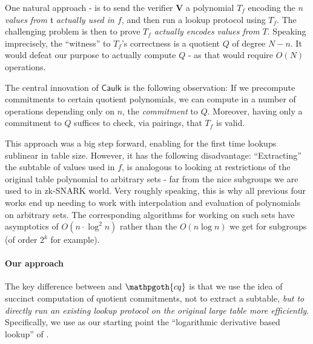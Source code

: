 \documentclass[11pt]{article} %
\newcommand{\cq}{\ensuremath{\mathpgoth{cq} }\xspace}
\newcommand{\caulk}{\ensuremath{\mathsf{Caulk}}\xspace}
\newcommand{\ver}{\ensuremath{\mathsf{\mathbf{V}}}\xspace}
\newcommand{\witsize}{\ensuremath{n}\xspace}
\newcommand{\witruntime}{\ensuremath{\witsize\log\witsize}\xspace}
\newcommand{\tabsize}{\ensuremath{N}\xspace}
\newcommand{\tab}{\ensuremath{\mathfrak{t}}\xspace}
\begin{document}
One natural approach - is to send  the verifier \ver a polynomial $T_f$ encoding 
the \emph{\witsize values from \tab actually used in $f$}, and then run a lookup protocol using $T_f$.
The challenging problem is then to prove \emph{$T_f$ actually encodes values from $T$}.
Speaking imprecisely, the ``witness'' to $T_f$'s correctness is a quotient $Q$ of degree $\tabsize-\witsize$.
It would defeat our purpose to actually compute $Q$ - as that would require $O(\tabsize)$ operations.

The central innovation of \caulk\cite{caulk} is the following observation: If we precompute commitments to certain quotient polynomials, we can compute in a number of operations depending only on \witsize, the \emph{commitment} to $Q$.
Moreover, having only a commitment to $Q$ suffices to check, via pairings, that $T_f$ is valid.




This approach was a big step forward, enabling for the first time lookups sublinear in table size.
However, it has the following disadvantage:
``Extracting'' the subtable of values used in $f$, is analogous to looking at restrictions of the original table polynomial to arbitrary sets - far
from the nice subgroups we are used to in zk-SNARK world. Very roughly speaking, this is why all previous four works end up needing to 
work with interpolation and evaluation of polynomials on arbitrary sets. The corresponding algorithms for working on such sets have asymptotics of $O(\witsize\cdot \log^2 \witsize)$ rather than the $O(\witruntime)$ we get for subgroups (of order $2^k$ for example).

\paragraph{Our approach}
The key difference between \cite{caulk,caulkp,flookup,baloo} and \cq is that we use the idea of succinct computation
of quotient commitments, not to extract a subtable, \emph{but to directly run an existing lookup protocol on the original large table more efficiently}.
Specifically, we use as our starting point the ``logarithmic derivative based lookup'' of \cite{bplusplus,mvlookup}.
\end{document}
